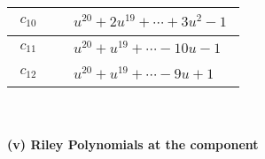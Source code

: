 \documentclass[1p]{elsarticle_modified}
\theoremstyle{definition}
\begin{document}
\begin{tabular}{m{50pt}|m{274pt}}
\hline $$\begin{aligned}c_{10}\end{aligned}$$&$\begin{aligned}
&u^{20}+2 u^{19}+\cdots+3 u^2-1
\end{aligned}$\\
\hline $$\begin{aligned}c_{11}\end{aligned}$$&$\begin{aligned}
&u^{20}+u^{19}+\cdots-10 u-1
\end{aligned}$\\
\hline $$\begin{aligned}c_{12}\end{aligned}$$&$\begin{aligned}
&u^{20}+u^{19}+\cdots-9 u+1
\end{aligned}$\\
\hline
\end{tabular}\\~\\
\newpage\renewcommand{\arraystretch}{1}
\flushleft \textbf{(v) Riley Polynomials at the component}\newline \\
\end{document}
